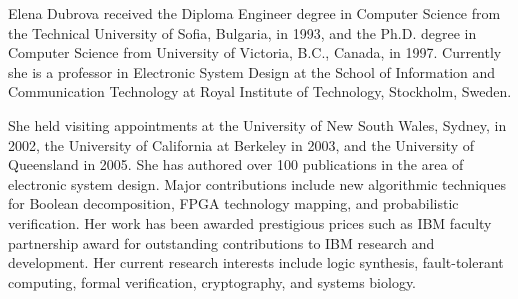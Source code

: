 \documentclass[twocolumn]{IEEEtran} \usepackage{epsfig}
\begin{document}
\begin{biography} []{Elena Dubrova}
received the Diploma Engineer degree in Computer Science from the Technical University of Sofia, Bulgaria, in 1993, and  the Ph.D. degree in Computer Science from University of Victoria, B.C., Canada, in 1997. Currently she is a professor in Electronic System Design at the School of Information and Communication Technology at Royal Institute of Technology, Stockholm, Sweden. 

She held visiting appointments at the University of New South Wales, Sydney, in 2002, the University of California at Berkeley in 2003, and the University of Queensland in 2005. She has authored over 100 publications in the area of electronic system design. Major contributions include new algorithmic techniques for Boolean decomposition, FPGA technology mapping, and probabilistic verification. Her work has been awarded prestigious prices such as IBM faculty partnership award for outstanding contributions to IBM research and development. Her current research interests include logic synthesis, fault-tolerant computing, formal verification, cryptography, and systems biology. 
\end{biography}
\end{document}

